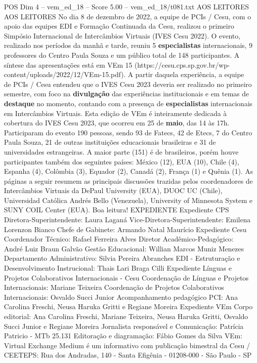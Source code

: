 \begin{textsample}{POS Dim 4 – vem\_ed\_18 – Score 5.00 – vem\_ed\_18/t081.txt}  \label{ex:f4_pos_045}
AOS LEITORES AOS LEITORES No dia 8 de dezembro de 2022, a equipe de PCIs / Cesu, com o apoio das equipes EDI e Formação Continuada da Cesu, realizou o primeiro Simpósio Internacional de Intercâmbios Virtuais (IVES Cesu 2022).
O evento, realizado nos períodos da manhã e tarde, reuniu 5 \textbf{especialistas} internacionais, 9 professores do Centro Paula Souza e um público total de 148 participantes.
A síntese das apresentações está em VEm 15 (https://cesu.cps.sp.gov.br/wp-content/uploads/2022/12/VEm-15.pdf).
A partir daquela experiência, a equipe de PCIs / Cesu entendeu que o IVES Cesu 2023 deveria ser realizado no primeiro semestre, com foco na \textbf{divulgação} das experiências institucionais e em temas de \textbf{destaque} no momento, contando com a presença de \textbf{especialistas} internacionais em Intercâmbios Virtuais.
Esta edição de VEm é inteiramente dedicada à cobertura do IVES Cesu 2023, que ocorreu em 25 de \textbf{maio}, das 14 às 17h.
Participaram do evento 190 pessoas, sendo 93 de Fatecs, 42 de Etecs, 7 do Centro Paula Souza, 21 de outras instituições educacionais brasileiras e 31 de universidades estrangeiras.
A maior parte (151) é de brasileiros, porém houve participantes também dos seguintes países: México (12), EUA (10), Chile (4), Espanha (4), Colômbia (3), Equador (2), Canadá (2), França (1) e Quênia (1).
As páginas a seguir resumem as principais discussões trazidas pelos coordenadores de Intercâmbios Virtuais da DePaul University (EUA), DUOC UC (Chile), Universidad Católica Andrés Bello (Venezuela), University of Minnesota System e SUNY COIL Center (EUA).
Boa leitura!
EXPEDIENTE Expediente CPS Diretora-Superintendente: Laura Laganá Vice-Diretora-Superintendente: Emilena Lorenzon Bianco Chefe de Gabinete: Armando Natal Maurício Expediente Cesu Coordenador Técnico: Rafael Ferreira Alves Diretor Acadêmico-Pedagógico: André Luiz Braun Galvão Gestão Educacional: Willian Marcos Muniz Menezes Departamento Administrativo: Silvia Pereira Abranches EDI - Estruturação e Desenvolvimento Instrucional: Thais Lari Braga Cilli Expediente Línguas e Projetos Colaborativos Internacionais - Cesu Coordenação de Línguas e Projetos Internacionais: Mariane Teixeira Coordenação de Projetos Colaborativos Internacionais: Osvaldo Succi Junior Acompanhamento pedagógico PCI: Ana Carolina Freschi, Neusa Haruka Gritti e Regiane Moreira Expediente VEm Corpo editorial: Ana Carolina Freschi, Mariane Teixeira, Neusa Haruka Gritti, Osvaldo Succi Junior e Regiane Moreira Jornalista responsável e Comunicação: Patrícia Patricio - MTb 25.131 Editoração e diagramação: Fábio Gomes da Silva VEm: Virtual Exchange Medium é um informativo com publicação bimestral da Cesu / CEETEPS: Rua dos Andradas, 140 - Santa Efigênia - 01208-000 - São Paulo - SP

\end{textsample}
